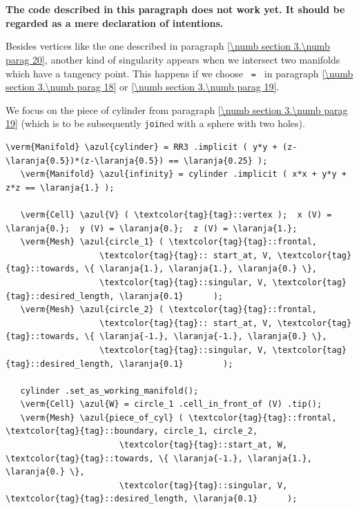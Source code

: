 \section{~~}\label{\numb section 3.\numb parag 21}

{\normalfont\bfseries The code described in this paragraph does not work yet.
It should be regarded as a mere declaration of intentions.}
\medskip

Besides vertices like the one described in paragraph \ref{\numb section 3.\numb parag 20},
another kind of singularity appears when we intersect two manifolds which have a tangency point.
This happens if we choose {\small\tt{} = } in paragraph
\ref{\numb section 3.\numb parag 18} or \ref{\numb section 3.\numb parag 19}.

We focus on the piece of cylinder from paragraph \ref{\numb section 3.\numb parag 19}
(which is to be subsequently {\small\tt join}ed with a sphere with two holes).

\begin{Verbatim}[commandchars=\\\{\},formatcom=\small\tt,frame=single,
   label=code not working,rulecolor=\color{moldura},
   baselinestretch=0.94,framesep=2mm                                  ]
   \verm{Manifold} \azul{cylinder} = RR3 .implicit ( y*y + (z-\laranja{0.5})*(z-\laranja{0.5}) == \laranja{0.25} );
   \verm{Manifold} \azul{infinity} = cylinder .implicit ( x*x + y*y + z*z == \laranja{1.} );

   \verm{Cell} \azul{V} ( \textcolor{tag}{tag}::vertex );  x (V) = \laranja{0.};  y (V) = \laranja{0.};  z (V) = \laranja{1.};
   \verm{Mesh} \azul{circle_1} ( \textcolor{tag}{tag}::frontal,
                   \textcolor{tag}{tag}:: start_at, V, \textcolor{tag}{tag}::towards, \{ \laranja{1.}, \laranja{1.}, \laranja{0.} \},
                   \textcolor{tag}{tag}::singular, V, \textcolor{tag}{tag}::desired_length, \laranja{0.1}      );
   \verm{Mesh} \azul{circle_2} ( \textcolor{tag}{tag}::frontal,
                   \textcolor{tag}{tag}:: start_at, V, \textcolor{tag}{tag}::towards, \{ \laranja{-1.}, \laranja{-1.}, \laranja{0.} \},
                   \textcolor{tag}{tag}::singular, V, \textcolor{tag}{tag}::desired_length, \laranja{0.1}        );

   cylinder .set_as_working_manifold();
   \verm{Cell} \azul{W} = circle_1 .cell_in_front_of (V) .tip();
   \verm{Mesh} \azul{piece_of_cyl} ( \textcolor{tag}{tag}::frontal, \textcolor{tag}{tag}::boundary, circle_1, circle_2,
                       \textcolor{tag}{tag}::start_at, W, \textcolor{tag}{tag}::towards, \{ \laranja{-1.}, \laranja{1.}, \laranja{0.} \},
                       \textcolor{tag}{tag}::singular, V, \textcolor{tag}{tag}::desired_length, \laranja{0.1}      );
\end{Verbatim}

